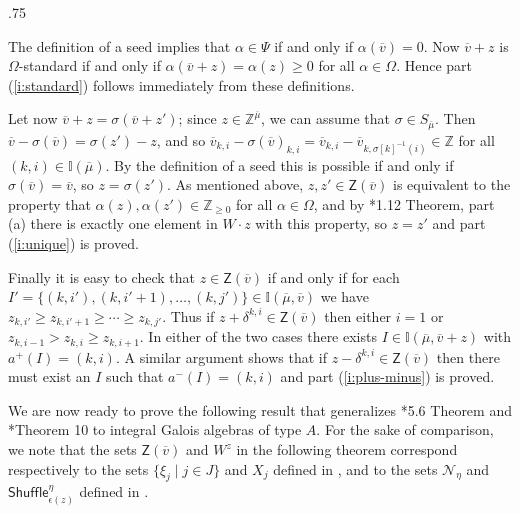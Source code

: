 \documentclass[11pt,fleqn]{amsart}
\makeatletter
\renewcommand\proofname{Proof}
\renewenvironment{proof}[1][\textit{\proofname}]{\par
 \pushQED{\qed}%
 \normalfont \topsep.75\paraskip\relax
 \trivlist
 \item[\hskip\labelsep
 \itshape
 #1\@addpunct{.}]\ignorespaces
}{%
 \popQED\endtrivlist\@endpefalse
}
\newcounter{para}[section]
\newcommand\ZZ{\mathbb Z}
\newcommand\II{\mathbb I}
\newcommand\Z{\mathsf Z}
\newcommand\vv{\overline{v}}
\makeatother
\begin{document}
\begin{proof}
The definition of a seed implies that $\alpha \in \Psi$ if and only if 
$\alpha(\vv) = 0$. Now $\vv + z$ is $\Omega$-standard if and only if 
$\alpha(\vv + z) = \alpha(z) \geq 0$ for all $\alpha \in \Omega$. Hence part
(\ref{i:standard}) follows immediately from these definitions. 

Let now $\vv + z = \sigma(\vv + z')$; since $z \in \ZZ^{\overline \mu}$, we 
can assume that $\sigma \in S_{\overline \mu}$. Then $\vv - \sigma(\vv) = 
\sigma(z') - z$, and so $\vv_{k,i} - \sigma(\vv)_{k,i} = \vv_{k,i} - \vv_{
k, \sigma[k]^{-1}(i)} \in \ZZ$ for all $(k,i) \in \II(\overline \mu)$. By the 
definition of a seed this is possible if and only if $\sigma(\vv) = \vv$, so 
$z = \sigma(z')$. As mentioned above, $z, z' \in \Z(\vv)$ is equivalent to the
property that $\alpha(z), \alpha(z') \in \ZZ_{\geq 0}$ for all $\alpha \in 
\Omega$, and by \cite{Hump-coxeter-book}*{1.12 Theorem, part (a)} there is 
exactly one element in $W\cdot z$ with this property, so $z = z'$ and part 
(\ref{i:unique}) is proved. 

Finally it is easy to check that $z \in \Z(\vv)$ if and only if for each $I' 
= \{(k,i'), (k,i'+1), \ldots, (k,j')\} \in \II(\overline \mu, \vv)$ we have 
$z_{k,i'} \geq z_{k,i'+1} \geq \cdots \geq z_{k,j'}$. Thus if $z + 
\delta^{k,i} \in \Z(\vv)$ then either $i = 1$ or $z_{k,i-1} > z_{k,i} \geq 
z_{k,i+1}$. In either of the two cases there exists $I \in \II(\overline \mu, 
\vv + z)$ with $a^+(I) = (k,i)$. A similar argument shows that if $z - 
\delta^{k,i} \in \Z(\vv)$ then there must exist an $I$ such that $a^-(I) = 
(k,i)$ and part (\ref{i:plus-minus}) is proved.
\end{proof}


We are now ready to prove the following result that generalizes 
\cite{RZ-singular-characters}*{5.6 Theorem} and 
\cite{EMV-orthogonal}*{Theorem 10} to integral Galois algebras of type $A$. 
For the sake of comparison, we note that the sets $\Z(\vv)$ and $W^z$ in the
following theorem correspond respectively to the sets $\{\xi_j \mid j \in J\}$ 
and $X_j$ defined in \cite{EMV-orthogonal}, and to the sets $\mathcal{N}_\eta$ 
and $\mathsf{Shuffle}^\eta_{\epsilon(z)}$ defined in 
\cite{RZ-singular-characters}. 
\end{document}
